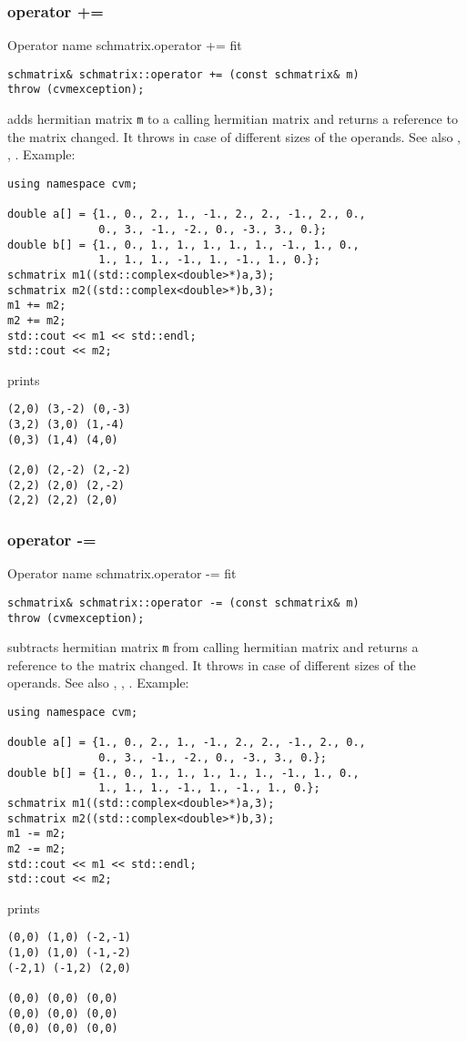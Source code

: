 \subsubsection{operator +=}
Operator%
\pdfdest name {schmatrix.operator +=} fit
\begin{verbatim}
schmatrix& schmatrix::operator += (const schmatrix& m) 
throw (cvmexception);
\end{verbatim}
adds  hermitian matrix \verb"m" to a calling hermitian matrix 
and returns a reference to
the matrix changed.
It throws  
in case of different sizes 
of the operands.
See also ,
,
.
Example:
\begin{Verbatim}
using namespace cvm;

double a[] = {1., 0., 2., 1., -1., 2., 2., -1., 2., 0.,
              0., 3., -1., -2., 0., -3., 3., 0.};
double b[] = {1., 0., 1., 1., 1., 1., 1., -1., 1., 0.,
              1., 1., 1., -1., 1., -1., 1., 0.};
schmatrix m1((std::complex<double>*)a,3);
schmatrix m2((std::complex<double>*)b,3);
m1 += m2;
m2 += m2;
std::cout << m1 << std::endl;
std::cout << m2;
\end{Verbatim}
prints
\begin{Verbatim}
(2,0) (3,-2) (0,-3)
(3,2) (3,0) (1,-4)
(0,3) (1,4) (4,0)

(2,0) (2,-2) (2,-2)
(2,2) (2,0) (2,-2)
(2,2) (2,2) (2,0)
\end{Verbatim}
\newpage




\subsubsection{operator -=}
Operator%
\pdfdest name {schmatrix.operator -=} fit
\begin{verbatim}
schmatrix& schmatrix::operator -= (const schmatrix& m) 
throw (cvmexception);
\end{verbatim}
subtracts  hermitian matrix \verb"m" from  calling hermitian matrix
and returns a reference to
the matrix changed.
It throws  
in case of different sizes 
of the operands.
See also ,
,
.
Example:
\begin{Verbatim}
using namespace cvm;

double a[] = {1., 0., 2., 1., -1., 2., 2., -1., 2., 0.,
              0., 3., -1., -2., 0., -3., 3., 0.};
double b[] = {1., 0., 1., 1., 1., 1., 1., -1., 1., 0.,
              1., 1., 1., -1., 1., -1., 1., 0.};
schmatrix m1((std::complex<double>*)a,3);
schmatrix m2((std::complex<double>*)b,3);
m1 -= m2;
m2 -= m2;
std::cout << m1 << std::endl;
std::cout << m2;
\end{Verbatim}
prints
\begin{Verbatim}
(0,0) (1,0) (-2,-1)
(1,0) (1,0) (-1,-2)
(-2,1) (-1,2) (2,0)

(0,0) (0,0) (0,0)
(0,0) (0,0) (0,0)
(0,0) (0,0) (0,0)
\end{Verbatim}
\newpage




